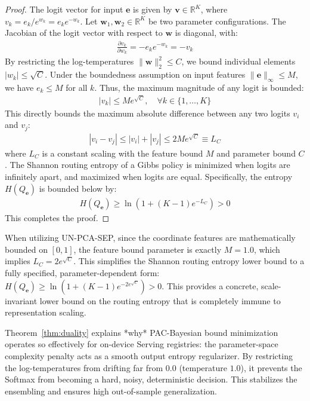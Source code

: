 \begin{proof}
The logit vector for input $\mathbf{e}$ is given by $\mathbf{v} \in \mathbb{R}^K$, where $v_k = e_k / e^{w_k} = e_k e^{-w_k}$. Let $\mathbf{w}_1, \mathbf{w}_2 \in \mathbb{R}^K$ be two parameter configurations. The Jacobian of the logit vector with respect to $\mathbf{w}$ is diagonal, with:
\begin{align}
    \frac{\partial v_k}{\partial w_k} = -e_k e^{-w_k} = -v_k
\end{align}
By restricting the log-temperatures $\|\mathbf{w}\|_2^2 \le C$, we bound individual elements $|w_k| \le \sqrt{C}$. Under the boundedness assumption on input features $\|\mathbf{e}\|_\infty \le M$, we have $e_k \le M$ for all $k$. Thus, the maximum magnitude of any logit is bounded:
\begin{align}
    |v_k| \le M e^{\sqrt{C}}, \quad \forall k \in \{1,\dots, K\}
\end{align}
This directly bounds the maximum absolute difference between any two logits $v_i$ and $v_j$:
\begin{align}
    |v_i - v_j| \le |v_i| + |v_j| \le 2 M e^{\sqrt{C}} \equiv L_C
\end{align}
where $L_C$ is a constant scaling with the feature bound $M$ and parameter bound $C$. The Shannon routing entropy of a Gibbs policy is minimized when logits are infinitely apart, and maximized when logits are equal. Specifically, the entropy $H(Q_\mathbf{e})$ is bounded below by:
\begin{align}
    H(Q_\mathbf{e}) \ge \ln \left( 1 + (K-1) e^{-L_C} \right) > 0
\end{align}
This completes the proof.
\end{proof}

When utilizing UN-PCA-SEP, since the coordinate features are mathematically bounded on $[0, 1]$, the feature bound parameter is exactly $M=1.0$, which implies $L_C = 2 e^{\sqrt{C}}$. This simplifies the Shannon routing entropy lower bound to a fully specified, parameter-dependent form: $H(Q_{\mathbf{e}}) \ge \ln(1 + (K-1)e^{-2 e^{\sqrt{C}}}) > 0$. This provides a concrete, scale-invariant lower bound on the routing entropy that is completely immune to representation scaling.

Theorem~\ref{thm:duality} explains *why* PAC-Bayesian bound minimization operates so effectively for on-device Serving registries: the parameter-space complexity penalty acts as a smooth output entropy regularizer. By restricting the log-temperatures from drifting far from $0.0$ (temperature $1.0$), it prevents the Softmax from becoming a hard, noisy, deterministic decision. This stabilizes the ensembling and ensures high out-of-sample generalization.


